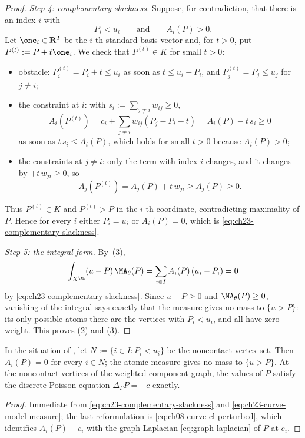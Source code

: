 \begin{proof}
\emph{Step 4: complementary slackness.}  Suppose, for contradiction, that
there is an index $i$ with
\[
 P_i<u_i\qquad\text{and}\qquad A_i(P)>0 .
\]
Let $\one_i\in\mathbf R^I$ be the $i$-th standard basis vector and, for
$t>0$, put $P^{(t)}:=P+t\one_i$.  We check that $P^{(t)}\in K$ for
small $t>0$:
\begin{itemize}
\item obstacle: $P^{(t)}_i=P_i+t\leq u_i$ as soon as
$t\leq u_i-P_i$, and $P^{(t)}_j=P_j\leq u_j$ for $j\ne i$;
\item the constraint at $i$: with
$s_i:=\sum_{j\ne i}w_{ij}\geq0$,
\[
 A_i(P^{(t)})=c_i+\sum_{j\ne i}w_{ij}(P_j-P_i-t)=A_i(P)-t\,s_i\geq0
\]
as soon as $t\,s_i\leq A_i(P)$, which holds for small $t>0$ because
$A_i(P)>0$;
\item the constraints at $j\ne i$: only the term with index $i$ changes,
and it changes by $+t\,w_{ji}\geq0$, so
\[
 A_j(P^{(t)})=A_j(P)+t\,w_{ji}\geq A_j(P)\geq0 .
\]
\end{itemize}
Thus $P^{(t)}\in K$ and $P^{(t)}>P$ in the $i$-th coordinate,
contradicting maximality of $P$.  Hence for every $i$ either
$P_i=u_i$ or $A_i(P)=0$, which is
\eqref{eq:ch23-complementary-slackness}.

\emph{Step 5: the integral form.}  By
\,(3),
\[
 \int_{X^{\An}}(u-P)\,\MA_\theta(P)
 =\sum_{i\in I}A_i(P)\,(u_i-P_i)=0
\]
by \eqref{eq:ch23-complementary-slackness}.  Since $u-P\geq0$ and
$\MA_\theta(P)\geq0$, vanishing of the integral says exactly that the
measure gives no mass to $\{u>P\}$: its only possible atoms there are
the vertices with $P_i<u_i$, and all have zero weight.  This proves (2)
and (3).
\end{proof}

\begin{corollary}
\label{cor:ch23-curve-harmonic-off-contact}
In the situation of , let
$N:=\{i\in I: P_i<u_i\}$ be the noncontact vertex set.  Then
$A_i(P)=0$ for every $i\in N$; the atomic measure gives no mass to
$\{u>P\}$.  At the noncontact vertices of the weighted component graph,
the values of $P$ satisfy the discrete Poisson equation
$\Delta_\Gamma P=-c$ exactly.
\end{corollary}

\begin{proof}
Immediate from \eqref{eq:ch23-complementary-slackness} and
\eqref{eq:ch23-curve-model-measure}; the last reformulation is
\eqref{eq:ch08-curve-cl-perturbed}, which identifies $A_i(P)-c_i$ with
the graph Laplacian \eqref{eq:graph-laplacian} of $P$ at $e_i$.
\end{proof}

